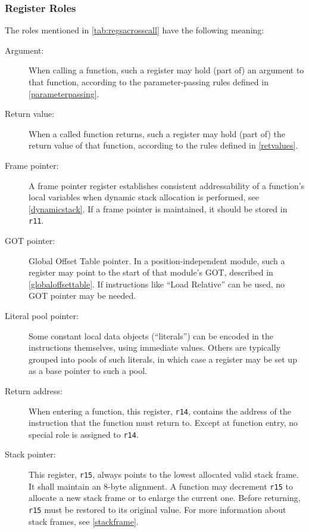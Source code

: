 \documentclass[USenglish,fontsize=11pt,twoside,%
  toc=bib,toc=idx,toc=graduated,numbers=noendperiod,
  bookmarks=true,
  bookmarksnumbered=true,
  bookmarksopen=true,
  bookmarksopenlevel=1,
  breaklinks=true,
  colorlinks=true,
  linkcolor=black,
  pdfpagelayout={TwoPageRight},
  pdfusetitle=true
]{scrreprt}
\begin{document}
\subsubsection{Register Roles}
The roles mentioned in \cref{tab:regsacrosscall}
have the following meaning:
\begin{description}
\item[Argument:]  When calling a function, such a
  register may hold {\ifzseries\else (part of) \fi}%
  an argument to that function, according to the parameter-passing rules
  defined in \cref{parameterpassing}.
\item[Return value:]  When a called function
  returns, such a register may hold {\ifzseries\else (part of)\fi}%
  the return value of that function, according to the rules defined in
  \cref{retvalues}.
\item[Frame pointer:]  A frame pointer register
  establishes consistent addressability of a function's local variables
  when dynamic stack allocation is performed, see \cref{dynamicstack}.  If
  a frame pointer is maintained, it should be stored in \texttt{r11}.
\item[GOT pointer:]  Global Offset Table pointer.  In a
  position-independent module, such a register may point to the start of
  that module's GOT, described in \cref{globaloffsettable}.  If
  instructions like ``Load Relative'' can be used, no GOT pointer may be
  needed.
\item[Literal pool pointer:]  Some constant
  local data objects (``literals'') can be encoded in the instructions
  themselves, using immediate values.  Others are typically grouped into
  pools of such literals, in which case a register may be set up as a base
  pointer to such a pool.
\item[Return address:]  When entering a
  function, this register, \texttt{r14}, contains the address of the
  instruction that the function must return to.  Except at function entry,
  no special role is assigned to \texttt{r14}.
\item[Stack pointer:]  This register, \texttt{r15},
  always points to the lowest allocated valid stack frame.  It shall
  maintain an 8-byte alignment.  A function may decrement \texttt{r15} to
  allocate a new stack frame or to enlarge the current one.  Before
  returning, \texttt{r15} must be restored to its original value.  For
  more information about stack frames, see \cref{stackframe}.
\end{description}
\end{document}
